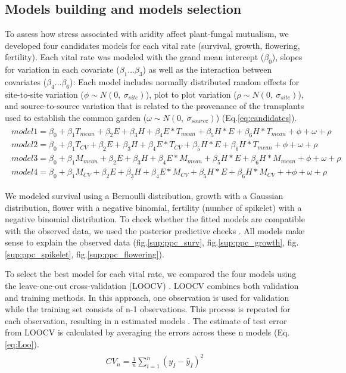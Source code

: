 \documentclass[11pt]{article}
\begin{document}
\subsection*{Models building and models selection}
To assess how stress associated with aridity  affect plant-fungal mutualism, we developed four candidates models for each vital rate (survival, growth, flowering, fertility). 
Each vital rate was modeled with  the  grand mean intercept ($\beta_{0}$), slopes for  variation in each covariate ($\beta_{1}$...$\beta_{3}$) as well as the interaction between covariates ($\beta_{4}$...$\beta_{6}$): 
Each model includes normally distributed random effects for site-to-site  variation ($\phi \sim N(0,\ \sigma_{site})$), plot to plot variation ($\rho \sim N(0,\ \sigma_{site})$), and source-to-source variation that is related to the  provenance of the transplants used to establish the common garden ($\omega \sim N(0,\ \sigma_{source})$) (Eq.\ref{eq:candidates}).
\begin{align}\label{eq:candidates}
\begin{split}
model1 = \beta_{0} + \beta_{1}T_{mean}  + \beta_{2}E + \beta_{3}H + \beta_{4}E*T_{mean} + \beta_{5}H*E +  \beta_{6}H*T_{mean} + \phi + \omega + \rho  \\ 
model2  = \beta_{0} + \beta_{1}T_{CV}  + \beta_{2}E + \beta_{3}H + \beta_{4}E*T_{CV} + \beta_{5}H*E +  \beta_{6}H*T_{mean} +  \phi + \omega + \rho  \\
model3  = \beta_{0} + \beta_{1}M_{mean}  + \beta_{2}E + \beta_{3}H + \beta_{4}E*M_{mean} + \beta_{5}H*E +  \beta_{6}H*M_{mean} + \phi + \omega + \rho \\
model4  = \beta_{0} + \beta_{1}M_{CV}  + \beta_{2}E + \beta_{3}H + \beta_{4}E*M_{CV} + \beta_{5}H*E +  \beta_{6}H*M_{CV} ++ \phi + \omega + \rho 
\end{split}
\end{align}
 
We modeled survival using a  Bernoulli distribution, growth with a Gaussian distribution, flower with a negative binomial,  fertility (number of spikelet) with a negative binomial distribution.
To check whether the fitted models are  compatible with the observed data, we used the posterior predictive checks \citep{gelman2000diagnostic,berkhof2000posterior}. 
All models make sense to explain the observed data (fig.\ref{sup:ppc_surv}, fig.\ref{sup:ppc_growth}, fig.\ref{sup:ppc_spikelet}, fig.\ref{sup:ppc_flowering}).

To select the best model for each vital rate, we compared the four models using the leave-one-out cross-validation (LOOCV)  \citep{vehtari2017practical}. 
LOOCV combines both validation and training methods. 
In this approach, one observation is used for validation while the training set consists of n-1 observations. 
This process is repeated for each observation, resulting in n estimated models \citep{silva2024robust}. 
The estimate of test error from LOOCV is calculated by averaging the errors across these n models (Eq.\ref{eq:Loo}).
\begin{align}\label{eq:Loo}
\begin{split}
CV_{n}=\frac {1}{n} \sum^{n}_{i=1}{(y_{I}-\hat{y}_{I})^2}
\end{split}
\end{align}
\end{document}
